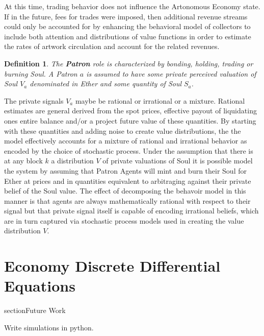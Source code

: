 \documentclass[11pt]{amsart}
\newtheorem{definition}{Definition}
\begin{document}
At this time, trading behavior does not influence the Artonomous Economy state. If in the future, fees for trades were imposed, then additional revenue streams could only be accounted for by enhancing the behavioral model of collectors to include both attention and distributions of value functions in order to estimate the rates of artwork circulation and account for the related revenues.

\begin{definition}
The \textbf{Patron} role is characterized by bonding, holding, trading or burning Soul.  A Patron $a$ is assumed to have some private perceived valuation of Soul $V_a$ denominated in Ether and some quantity of Soul $S_a$.  
\end{definition}

The private signals $V_a$ maybe be rational or irrational or a mixture. Rational estimates are general derived from the spot prices, effective payout of liquidating ones entire balance and/or a project future value of these quantities. By starting with these quantities and adding noise to create value distributions, the the model effectively accounts for a mixture of rational and irrational behavior as encoded by the choice of stochastic process. Under the assumption that there is at any block $k$ a distribution $V$ of private valuations of Soul it is possible model the system by assuming that Patron Agents will  mint and burn their Soul for Ether at prices and in quantities equivalent to arbitraging against their private belief of the Soul value. The effect of decomposing the behavoir model in this manner is that agents are always mathematically rational with respect to their signal but that private signal itself is capable of encoding irrational beliefs, which are in turn captured via stochastic process models used in creating the value distribution $V$.


\section{Economy Discrete Differential Equations}

section{Future Work} 

Write simulations in python.
\end{document}
